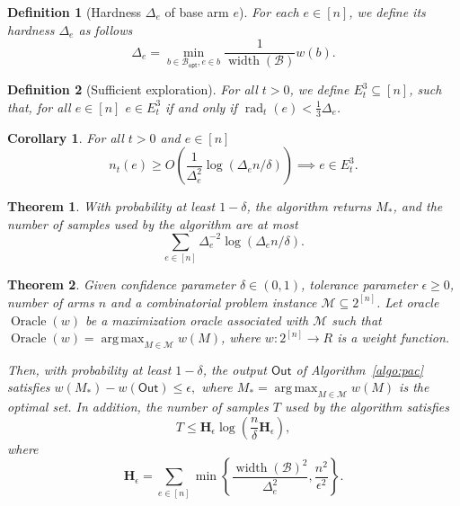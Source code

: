 \documentclass{article}
\newtheorem{define}{Definition}
\newtheorem{corollary}{Corollary}
\newtheorem{theorem}{Theorem}
\newcommand{\M}{\mathcal M}
\newcommand{\B}{\mathcal B}
\newcommand{\Bopt}{\mathcal B_{\mathsf{opt}}}
\DeclareMathOperator{\rank}{width}
\DeclareMathOperator{\rad}{rad}
\DeclareMathOperator*{\argmax}{arg\,max}
\DeclareMathOperator{\Oracle}{Oracle}
\newcommand{\out}{\mathsf{Out}}
\begin{document}
\begin{spacing}{1.1}
\begin{define}[Hardness $\Delta_e$ of base arm $e$]
For each $e\in [n]$, we define its hardness $\Delta_e$ as follows
$$
\Delta_e = \min_{b\in \Bopt, e\in b} \frac{1}{\rank(\B)} w(b).
$$
\end{define}

\begin{define}[Sufficient exploration]
For all $t>0$, we define $E_t^3 \subseteq [n]$, such that, for all $e\in[n]$
$e\in E_t^3$ if and only if $\rad_t(e) < \frac{1}{3} \Delta_e$.
\end{define}

\begin{corollary}
For all $t>0$ and $e\in[n]$
$$ n_t(e) \ge O(\frac{1}{\Delta_e^2}\log(\Delta_e n/\delta)) \implies e\in E_t^3.$$
\end{corollary}

\begin{theorem}
With probability at least $1-\delta$,
the algorithm returns $M_*$,
and the number of samples used by the algorithm are at most
$$
\sum_{e\in [n]} \Delta_e^{-2}\log(\Delta_e n/\delta).
$$
\end{theorem}


\begin{theorem}
Given confidence parameter $\delta \in (0,1)$, tolerance parameter $\epsilon \ge 0$, number of arms $n$ and a combinatorial problem instance $\mathcal M \subseteq 2^{[n]}$.
Let oracle $\Oracle(w)$ be a maximization oracle associated with $\mathcal M$ such that
$\Oracle(w) = \argmax_{M \in \mathcal M} w(M)$, where $w: 2^{[n]} \rightarrow R$ is a weight function.

Then, with probability at least $1-\delta$, the output $\out$ of Algorithm~\ref{algo:pac} satisfies
$
w(M_*)-w(\out) \le \epsilon,
$
where $M_* = \argmax_{M\in \M} w(M)$ is the optimal set.
In addition, the number of samples $T$ used by the algorithm satisfies
$$
T \le \mathbf H_\epsilon \log\left(\frac{n}{\delta}\mathbf H_\epsilon\right),
$$
where
$$
\mathbf H_\epsilon = \sum_{e\in[n]} \min\left\{\frac{\rank(\B)^2}{\Delta_e^2}, \frac{n^2}{\epsilon^2}\right\}.
$$
\end{theorem}


\end{spacing}
\end{document}
